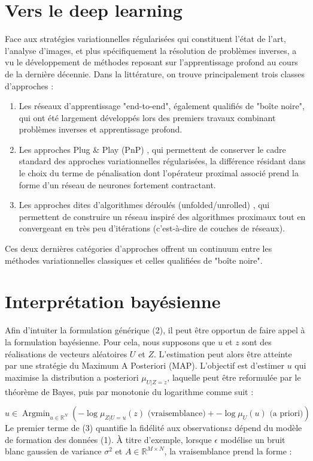 \documentclass[a4paper, 12pt]{article} %
\begin{document}
\section*{Vers le deep learning}
Face aux stratégies variationnelles régularisées qui constituent l'état de l'art, l'analyse d'images, et plus spécifiquement la résolution de problèmes inverses, a vu le développement de méthodes reposant sur l'apprentissage profond au cours de la dernière décennie. Dans la littérature, on trouve principalement trois classes d'approches :

\begin{enumerate}
    \item Les réseaux d'apprentissage "end-to-end", également qualifiés de "boîte noire", qui ont été largement développés lors des premiers travaux combinant problèmes inverses et apprentissage profond.
    \item Les approches Plug \& Play (PnP) \cite{25}, qui permettent de conserver le cadre standard des approches variationnelles régularisées, la différence résidant dans le choix du terme de pénalisation dont l'opérateur proximal \cite{23} associé prend la forme d'un réseau de neurones fortement contractant.
    \item Les approches dites d'algorithmes déroulés (unfolded/unrolled) \cite{1}, qui permettent de construire un réseau inspiré des algorithmes proximaux tout en convergeant en très peu d'itérations (c'est-à-dire de couches de réseaux).
\end{enumerate}
Ces deux dernières catégories d'approches offrent un continuum entre les méthodes variationnelles classiques et celles qualifiées de "boîte noire".
\section{Interprétation bayésienne}
Afin d'intuiter la formulation générique (2), il peut être opportun de faire appel à la formulation bayésienne. Pour cela, nous supposons que \( u \) et \( z \) sont des réalisations de vecteurs aléatoires \( U \) et \( Z \). L'estimation peut alors être atteinte par une stratégie du Maximum A Posteriori (MAP). L'objectif est d'estimer \( u \) qui maximise la distribution a posteriori \( \mu_{U|Z=z} \), laquelle peut être reformulée par le théorème de Bayes, puis par monotonie du logarithme comme suit :

\[
\hat{u} \in \operatorname{Argmin}_{u \in \mathbb{R}^N} \left( -\log \mu_{Z|U=u}(z) \text{ (vraisemblance)} + -\log \mu_U(u) \text{ (a priori)} \right)
\]
Le premier terme de (3) quantifie la fidélité aux observations\( z \) dépend du modèle de formation des données (1). À titre d'exemple, lorsque \( \epsilon \) modélise un bruit blanc gaussien de variance \( \sigma^2 \) et \( A \in \mathbb{R}^{M \times N} \), la vraisemblance prend la forme :
\end{document}
